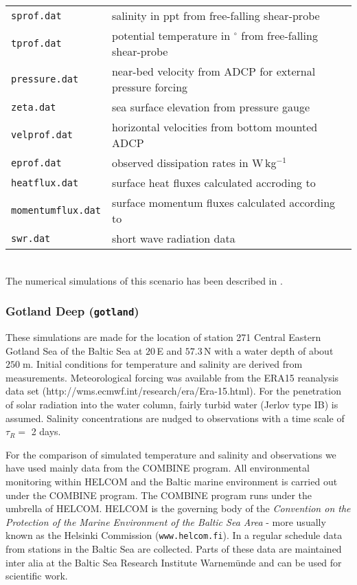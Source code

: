 \begin{tabular}{ll}
{\tt sprof.dat} & salinity in ppt from free-falling shear-probe \\
{\tt tprof.dat} & potential temperature in $^{\circ}$ from free-falling shear-probe \\
{\tt pressure.dat} & near-bed velocity from ADCP for external pressure forcing \\
{\tt zeta.dat} & sea surface elevation from pressure gauge \\
{\tt velprof.dat} &  horizontal velocities from bottom mounted ADCP \\
{\tt eprof.dat} & observed dissipation rates in W\,kg$^{-1}$ \\
{\tt heatflux.dat} & surface heat fluxes calculated accroding to \cite{Kondo75} \\
{\tt momentumflux.dat} & surface momentum fluxes calculated according to \cite{Kondo75} \\
{\tt swr.dat} & short wave radiation data \\
\end{tabular}
\\


The numerical simulations of this scenario
has been described in \cite{Simpsonetal2002}.

\subsubsection{Gotland Deep ({\tt gotland})}\label{gotland_deep}

These simulations are made for the location of
station 271 Central Eastern
Gotland Sea of the Baltic Sea at
$20\,$E and $57.3\,$N with a water depth of about $250\;$m.
Initial conditions for temperature and salinity are derived from measurements. 
Meteorological
forcing was available from the ERA15 reanalysis data set
(http://wms.ecmwf.int/research/era/Era-15.html). 
For the penetration of solar radiation into the
water column, fairly turbid water (Jerlov type IB) is assumed. 
Salinity concentrations are nudged to observations with a time scale of
$\tau_R=$ 2 days.

For the comparison of simulated temperature and salinity
and observations  we have used mainly
data from the COMBINE program. All environmental monitoring within HELCOM
and the Baltic marine environment is carried out under the COMBINE program.
The COMBINE program runs under the umbrella of HELCOM.
HELCOM is the governing body of the {\it Convention on the Protection of the
Marine Environment of the Baltic Sea Area} - more usually known as the
Helsinki Commission ({\tt www.helcom.fi}). In a regular schedule data from
stations in the Baltic Sea are collected. Parts of these data are maintained
inter alia at the Baltic Sea Research Institute Warnem\"unde
and can be used for
scientific work. 

